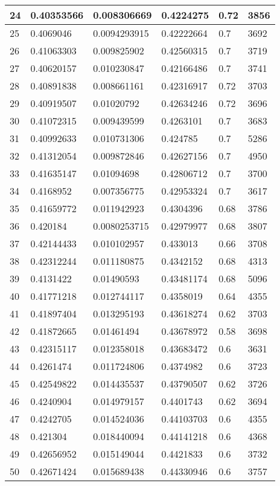 \begin{longtable}{|l|l|l|l|l|l|}
24 & 0.40353566 & 0.008306669 & 0.4224275 & 0.72 & 3856 \\ \hline 
25 & 0.4069046 & 0.0094293915 & 0.42222664 & 0.7 & 3692 \\ \hline 
26 & 0.41063303 & 0.009825902 & 0.42560315 & 0.7 & 3719 \\ \hline 
27 & 0.40620157 & 0.010230847 & 0.42166486 & 0.7 & 3741 \\ \hline 
28 & 0.40891838 & 0.008661161 & 0.42316917 & 0.72 & 3703 \\ \hline 
29 & 0.40919507 & 0.01020792 & 0.42634246 & 0.72 & 3696 \\ \hline 
30 & 0.41072315 & 0.009439599 & 0.4263101 & 0.7 & 3683 \\ \hline 
31 & 0.40992633 & 0.010731306 & 0.424785 & 0.7 & 5286 \\ \hline 
32 & 0.41312054 & 0.009872846 & 0.42627156 & 0.7 & 4950 \\ \hline 
33 & 0.41635147 & 0.01094698 & 0.42806712 & 0.7 & 3700 \\ \hline 
34 & 0.4168952 & 0.007356775 & 0.42953324 & 0.7 & 3617 \\ \hline 
35 & 0.41659772 & 0.011942923 & 0.4304396 & 0.68 & 3786 \\ \hline 
36 & 0.420184 & 0.0080253715 & 0.42979977 & 0.68 & 3807 \\ \hline 
37 & 0.42144433 & 0.010102957 & 0.433013 & 0.66 & 3708 \\ \hline 
38 & 0.42312244 & 0.011180875 & 0.4342152 & 0.68 & 4313 \\ \hline 
39 & 0.4131422 & 0.01490593 & 0.43481174 & 0.68 & 5096 \\ \hline 
40 & 0.41771218 & 0.012744117 & 0.4358019 & 0.64 & 4355 \\ \hline 
41 & 0.41897404 & 0.013295193 & 0.43618274 & 0.62 & 3703 \\ \hline 
42 & 0.41872665 & 0.01461494 & 0.43678972 & 0.58 & 3698 \\ \hline 
43 & 0.42315117 & 0.012358018 & 0.43683472 & 0.6 & 3631 \\ \hline 
44 & 0.4261474 & 0.011724806 & 0.4374982 & 0.6 & 3723 \\ \hline 
45 & 0.42549822 & 0.014435537 & 0.43790507 & 0.62 & 3726 \\ \hline 
46 & 0.4240904 & 0.014979157 & 0.4401743 & 0.62 & 3694 \\ \hline 
47 & 0.4242705 & 0.014524036 & 0.44103703 & 0.6 & 4355 \\ \hline 
48 & 0.421304 & 0.018440094 & 0.44141218 & 0.6 & 4368 \\ \hline 
49 & 0.42656952 & 0.015149044 & 0.4421833 & 0.6 & 3732 \\ \hline 
50 & 0.42671424 & 0.015689438 & 0.44330946 & 0.6 & 3757 \\ \hline 
\end{longtable}